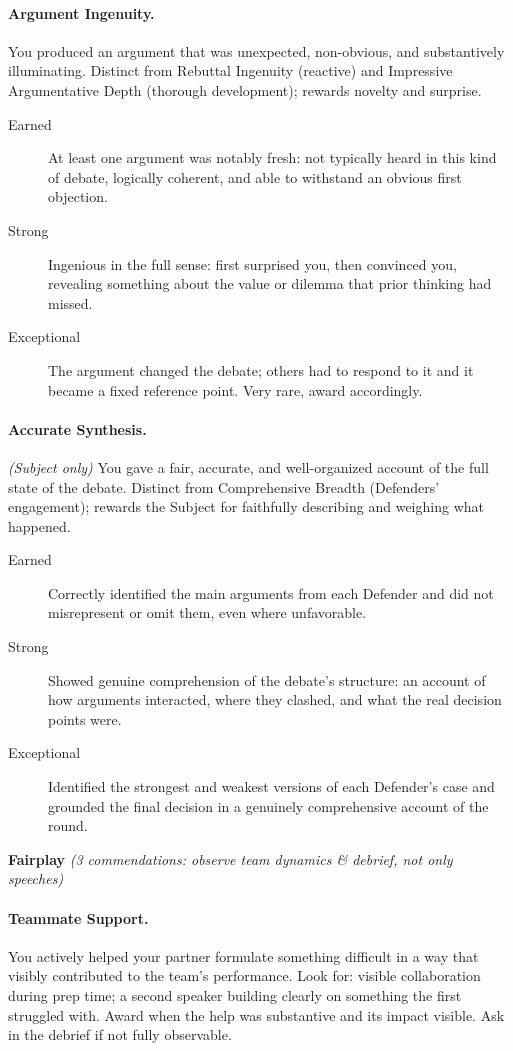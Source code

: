 \paragraph{Argument Ingenuity.} You produced an argument that was unexpected, non-obvious, and substantively illuminating. Distinct from Rebuttal Ingenuity (reactive) and Impressive Argumentative Depth (thorough development); rewards novelty and surprise.
\begin{description}
    \item[Earned] At least one argument was notably fresh: not typically heard in this kind of debate, logically coherent, and able to withstand an obvious first objection.
    \item[Strong] Ingenious in the full sense: first surprised you, then convinced you, revealing something about the value or dilemma that prior thinking had missed.
    \item[Exceptional] The argument changed the debate; others had to respond to it and it became a fixed reference point. Very rare, award accordingly.
\end{description}

\paragraph{Accurate Synthesis.} \textit{(Subject only)} You gave a fair, accurate, and well-organized account of the full state of the debate. Distinct from Comprehensive Breadth (Defenders' engagement); rewards the Subject for faithfully describing and weighing what happened.
\begin{description}
    \item[Earned] Correctly identified the main arguments from each Defender and did not misrepresent or omit them, even where unfavorable.
    \item[Strong] Showed genuine comprehension of the debate's structure: an account of how arguments interacted, where they clashed, and what the real decision points were.
    \item[Exceptional] Identified the strongest and weakest versions of each Defender's case and grounded the final decision in a genuinely comprehensive account of the round.
\end{description}

\medskip
\noindent\textbf{Fairplay} \textit{(3 commendations: observe team dynamics \& debrief, not only speeches)}

\paragraph{Teammate Support.} You actively helped your partner formulate something difficult in a way that visibly contributed to the team's performance. Look for: visible collaboration during prep time; a second speaker building clearly on something the first struggled with. Award when the help was substantive and its impact visible. Ask in the debrief if not fully observable.

